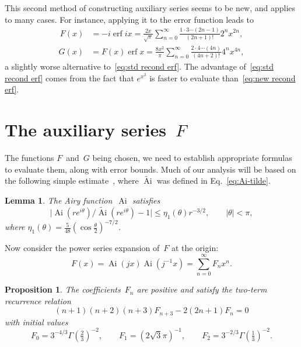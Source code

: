 \documentclass[10pt, conference]{IEEEtran}
\DeclareMathOperator{\Ai}{Ai}
\DeclareMathOperator{\erf}{erf}
\newcommand{\abs}[1]{\mathopen|#1\mathclose|}
\newtheorem{lemma}{Lemma}
\newtheorem{proposition}{Proposition}
\begin{document}
This second method of constructing auxiliary series seems to be new, and applies to many cases.
For instance, applying it to the error function leads to
\begin{align}
  \label{eq:new recond erf}
    F(x) &= -i \erf{i x} = \frac{2x}{\sqrt \pi} \sum_{n=0}^\infty \frac{1\cdot3\cdots(2n-1)}{(2n+1)!} 2^{n} x^{2n},
\end{align}
\begin{align}
    G(x) &= F(x) \erf x = \frac{8 x^2}{\pi} \sum_{n=0}^\infty \frac{2\cdot4\cdots(4n)}{(4n+2)!} 4^n x^{4n},
\end{align}
a slightly worse alternative to~\eqref{eq:std recond erf}.
The advantage of~\eqref{eq:std recond erf} comes from the fact that $e^{x^2}$ is faster to evaluate than~\eqref{eq:new recond erf}.


\section{The auxiliary series~$F$}
\label{sec:F}

The functions $F$~and~$G$ being chosen, we need to establish appropriate formulas to evaluate them, along with error bounds.
Much of our analysis will be based on the following simple
estimate~{\cite[Chap.~4, {\S}4.1]{Olver1997}}, where $\widetilde{\Ai}$ was defined in Eq.~\eqref{eq:Ai-tilde}.

\begin{lemma}
  \label{lem:asympt approx Ai}The Airy function~$\Ai$ satisfies
  \[ \abs{\Ai(re^{i \theta}) / \widetilde{\Ai}
    (re^{i \theta}) - 1} \leq \eta_1(\theta
    ) r^{- 3 / 2}, \hspace{2em} \abs{\theta} < \pi, \]
  where
  $\eta_1(\theta) = \frac{5}{48} (\cos \frac{\theta}{2})^{-7/2}$.
\end{lemma}

Now consider the power series expansion of~$F$ at the origin:
\begin{equation}
  F(x) = \Ai(jx) \Ai(j^{- 1} x
 ) = \sum_{n = 0}^{\infty} F_n x^n . \label{eq:series F}
\end{equation}

\begin{proposition}
  \label{prop:rec F}The coefficients~$F_n$ are positive and satisfy the
  two-term recurrence relation
  \begin{equation}
   (n + 1) (n + 2) (n + 3) F_{n + 3}
    - 2(2 n + 1) F_n = 0 \label{eq:rec F}
  \end{equation}
  with initial values
  \[
    F_0 = 3^{-4 / 3} \Gamma(\tfrac{2}{3})^{-2},
    \hspace{2em} F_1 = (2 \sqrt{3} \pi)^{-1},
  \hspace{2em} F_2 = 3^{-2 / 3} \Gamma(\tfrac{1}{3})^{-2}. \]
  
\end{proposition}
\end{document}
